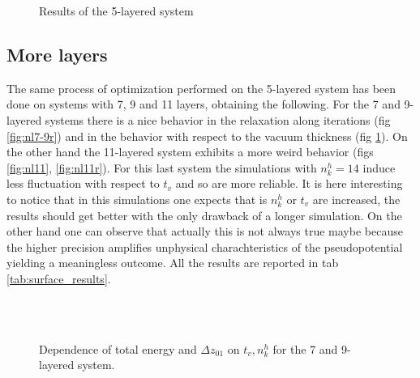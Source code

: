 \documentclass[a4paper, 11pt]{article}
\begin{document}
    \begin{figure}[H]
      \centering
      \begin{subfigure}[Behavior of total energy and $\Delta z_{01}$ with respect to $t_v$ with 10 horizontal n k points.]{
        \label{fig:nl5_nk10}}
      \end{subfigure}
      \begin{subfigure}[Relaxation of the layers during the simulation. Solid line with $t_v = 18 \si{.a.u}, n_k^h = 10$; dashed line with $t_v = 25 \si{.a.u}, n_k^h = 12$]{
        \label{fig:nl5_relaxation}}
      \end{subfigure}
      \caption{Results of the 5-layered system}
    \end{figure}

  \subsection{More layers}
    The same process of optimization performed on the 5-layered system has been done on systems with 7, 9 and 11 layers, obtaining the following.
    For the 7 and 9-layered systems there is a nice behavior in the relaxation along iterations (fig \ref{fig:nl7-9r}) and in the behavior with respect to the vacuum thickness (fig \ref{fig:nl7-9}). On the other hand the 11-layered system exhibits a more weird behavior (figs \ref{fig:nl11}, \ref{fig:nl11r}). For this last system the simulations with $n_k^h = 14$ induce less fluctuation with respect to $t_v$ and so are more reliable.
    It is here interesting to notice that in this simulations one expects that is $n_k^h$ or $t_v$ are increased, the results should get better with the only drawback of a longer simulation. On the other hand one can observe that actually this is not always true maybe because the higher precision amplifies unphysical charachteristics of the pseudopotential yielding a meaningless outcome.
    All the results are reported in tab \ref{tab:surface_results}.

    \begin{figure}
      \centering
      \\
      \\
      \caption{Dependence of total energy and $\Delta z_{01}$ on $t_v, n_k^h$ for the 7 and 9-layered system.}
      \label{fig:nl7-9}
    \end{figure}
\end{document}
